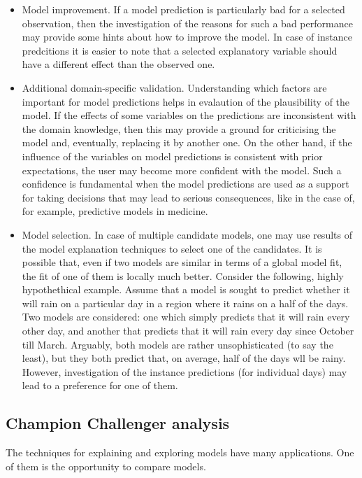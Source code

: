 \documentclass[12pt,]{krantz}
\begin{document}
\begin{itemize}
\item
  Model improvement. If a model prediction is particularly bad for a selected observation, then the investigation of the reasons for such a bad performance may provide some hints about how to improve the model. In case of instance predcitions it is easier to note that a selected explanatory variable should have a different effect than the observed one.
\item
  Additional domain-specific validation. Understanding which factors are important for model predictions helps in evalaution of the plausibility of the model. If the effects of some variables on the predictions are inconsistent with the domain knowledge, then this may provide a ground for criticising the model and, eventually, replacing it by another one. On the other hand, if the influence of the variables on model predictions is consistent with prior expectations, the user may become more confident with the model. Such a confidence is fundamental when the model predictions are used as a support for taking decisions that may lead to serious consequences, like in the case of, for example, predictive models in medicine.
\item
  Model selection. In case of multiple candidate models, one may use results of the model explanation techniques to select one of the candidates. It is possible that, even if two models are similar in terms of a global model fit, the fit of one of them is locally much better. Consider the following, highly hypothethical example. Assume that a model is sought to predict whether it will rain on a particular day in a region where it rains on a half of the days. Two models are considered: one which simply predicts that it will rain every other day, and another that predicts that it will rain every day since October till March. Arguably, both models are rather unsophisticated (to say the least), but they both predict that, on average, half of the days wll be rainy. However, investigation of the instance predictions (for individual days) may lead to a preference for one of them.
\end{itemize}

\hypertarget{champion-challenger-analysis-1}{%
\subsection{Champion Challenger analysis}\label{champion-challenger-analysis-1}}

The techniques for explaining and exploring models have many applications. One of them is the opportunity to compare models.
\end{document}
